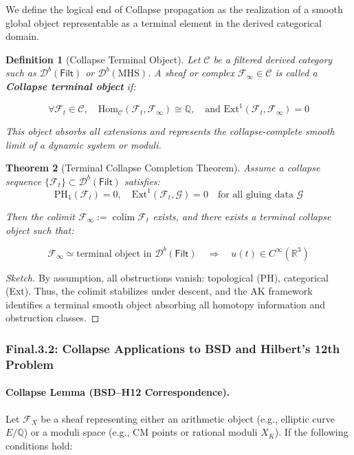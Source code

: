 \documentclass[11pt]{article}
\DeclareMathOperator{\colim}{colim}
\newtheorem{theorem}{Theorem}[section]
\newtheorem{definition}[theorem]{Definition}
\begin{document}
\begin{axiom}
\begin{axiom}
{{We define the logical end of Collapse propagation as the realization of a smooth global object  
representable as a terminal element in the derived categorical domain.

\begin{definition}[Collapse Terminal Object]
Let \( \mathcal{C} \) be a filtered derived category such as \( \mathcal{D}^b(\mathsf{Filt}) \) or \( \mathcal{D}^b(\mathrm{MHS}) \).  
A sheaf or complex \( \mathcal{F}_\infty \in \mathcal{C} \) is called a \textbf{Collapse terminal object} if:

\[
\forall \mathcal{F}_t \in \mathcal{C}, \quad \mathrm{Hom}_{\mathcal{C}}(\mathcal{F}_t, \mathcal{F}_\infty) \cong \mathbb{Q}, \quad \text{and } \mathrm{Ext}^1(\mathcal{F}_t, \mathcal{F}_\infty) = 0
\]

This object absorbs all extensions and represents the collapse-complete smooth limit of a dynamic system or moduli.
\end{definition}

\begin{theorem}[Terminal Collapse Completion Theorem]
Assume a collapse sequence \( \{\mathcal{F}_t\} \subset \mathcal{D}^b(\mathsf{Filt}) \) satisfies:
\[
\mathrm{PH}_1(\mathcal{F}_t) = 0, \quad \mathrm{Ext}^1(\mathcal{F}_t, \mathcal{G}) = 0 \quad \text{for all gluing data } \mathcal{G}
\]

Then the colimit \( \mathcal{F}_\infty := \colim \mathcal{F}_t \) exists, and there exists a terminal collapse object  
such that:

\[
\mathcal{F}_\infty \simeq \text{terminal object in } \mathcal{D}^b(\mathsf{Filt})
\quad \Rightarrow \quad u(t) \in C^\infty(\mathbb{R}^3)
\]
\end{theorem}

\begin{proof}[Sketch]
By assumption, all obstructions vanish: topological (PH), categorical (Ext).  
Thus, the colimit stabilizes under descent, and the AK framework identifies a terminal smooth object  
absorbing all homotopy information and obstruction classes.
\end{proof}

\subsubsection*{Final.3.2: Collapse Applications to BSD and Hilbert’s 12th Problem}

\paragraph{Collapse Lemma (BSD–H12 Correspondence).}
Let \( \mathcal{F}_X \) be a sheaf representing either an arithmetic object (e.g., elliptic curve \( E/\mathbb{Q} \))  
or a moduli space (e.g., CM points or rational moduli \( X_K \)).  
If the following conditions hold:

}}
\end{axiom}
\end{axiom}
\end{document}
